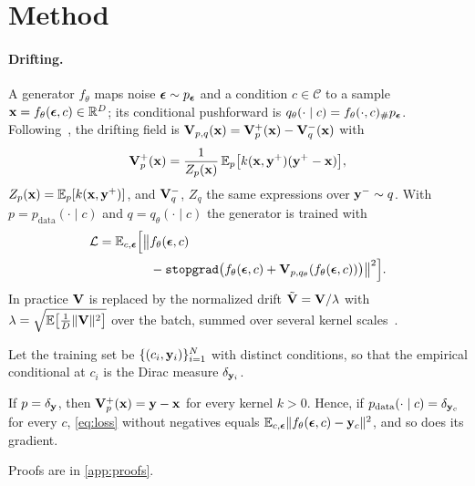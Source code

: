 \section{Method}
\label{sec:method}

\paragraph{Drifting.} A generator $f_\theta$ maps noise $\boldsymbol{\epsilon}\sim p_{\boldsymbol{\epsilon}}$ and a condition $c\in\mathcal C$ to a sample
$\mathbf{x}=f_\theta(\boldsymbol{\epsilon},c)\in\mathbb R^{D}$; its conditional pushforward is $q_\theta(\cdot\mid c)=f_\theta(\cdot,c)_{\#}p_{\boldsymbol{\epsilon}}$.
Following~\cite{deng2026drifting}, the drifting field is $\mathbf{V}_{p,q}(\mathbf{x})=\mathbf{V}^{+}_{p}(\mathbf{x})-\mathbf{V}^{-}_{q}(\mathbf{x})$ with
\begin{equation}
  \mathbf{V}^{+}_{p}(\mathbf{x}) = \frac{1}{Z_p(\mathbf{x})}\,\mathbb E_{p}\big[k(\mathbf{x},\mathbf{y}^{+})(\mathbf{y}^{+}-\mathbf{x})\big],
  \label{eq:vplus}
\end{equation}
$Z_p(\mathbf{x})=\mathbb E_{p}[k(\mathbf{x},\mathbf{y}^{+})]$, and $\mathbf{V}^{-}_{q}$, $Z_q$ the same expressions over $\mathbf{y}^{-}\sim q$. With
$p=p_\mathrm{data}(\cdot\mid c)$ and $q=q_\theta(\cdot\mid c)$ the generator is trained with
\begin{equation}
  \begin{split}
  \mathcal L=\mathbb E_{c,\boldsymbol{\epsilon}}\Big[\big\lVert &f_\theta(\boldsymbol{\epsilon},c)\\
  &-\text{\texttt{stopgrad}}\big(f_\theta(\boldsymbol{\epsilon},c)+\mathbf{V}_{p,q_\theta}(f_\theta(\boldsymbol{\epsilon},c))\big)\big\rVert^2\Big].
  \end{split}
  \label{eq:loss}
\end{equation}
In practice $\mathbf{V}$ is replaced by the normalized drift $\tilde{\mathbf{V}}=\mathbf{V}/\lambda$ with
$\lambda=\sqrt{\mathbb E\big[\tfrac1D\lVert\mathbf{V}\rVert^2\big]}$ over the batch, summed over several kernel
scales~\cite{deng2026drifting}.

Let the training set be $\{(c_i,\mathbf{y}_i)\}_{i=1}^N$ with distinct conditions, so that the empirical conditional at $c_i$
is the Dirac measure $\delta_{\mathbf{y}_i}$.
\begin{lemma}\label{lem:regression}
If $p=\delta_{\mathbf{y}}$, then $\mathbf{V}^{+}_{p}(\mathbf{x})=\mathbf{y}-\mathbf{x}$ for every kernel $k>0$. Hence, if $p_\mathrm{data}(\cdot\mid c)=\delta_{\mathbf{y}_c}$
for every $c$, \eqref{eq:loss} without negatives equals $\mathbb E_{c,\boldsymbol{\epsilon}}\lVert f_\theta(\boldsymbol{\epsilon},c)-\mathbf{y}_c\rVert^2$, and so
does its gradient.
\end{lemma}
\noindent Proofs are in \cref{app:proofs}.


